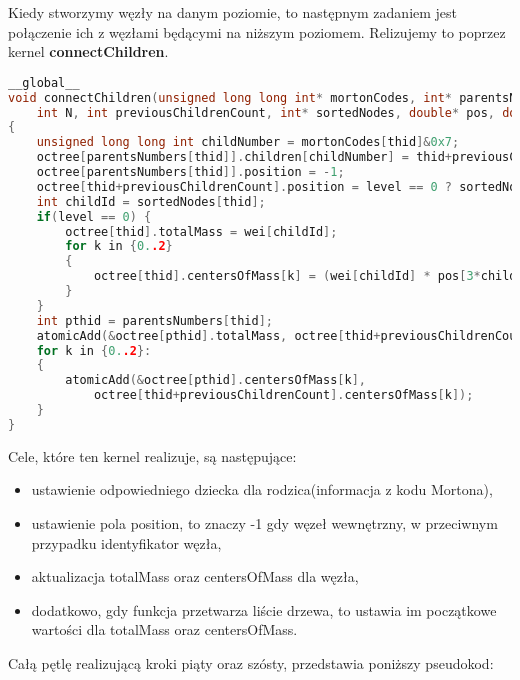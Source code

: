 \documentclass[14pt,twoside,a4paper]{article}
\theoremstyle{definition}
\begin{document}
Kiedy stworzymy węzły na danym poziomie, to następnym zadaniem jest połączenie ich z węzłami będącymi na niższym poziomem. Relizujemy to poprzez kernel \textbf{connectChildren}.
\begin{lstlisting}[language=C++, frame=single, framerule=2pt, caption=Kernel connectChildren]
__global__
void connectChildren(unsigned long long int* mortonCodes, int* parentsNumbers, OctreeNode* octree, 
    int N, int previousChildrenCount, int* sortedNodes, double* pos, double* wei, int level) 
{
    unsigned long long int childNumber = mortonCodes[thid]&0x7; 
    octree[parentsNumbers[thid]].children[childNumber] = thid+previousChildrenCount;
    octree[parentsNumbers[thid]].position = -1;
    octree[thid+previousChildrenCount].position = level == 0 ? sortedNodes[thid] : -1;
    int childId = sortedNodes[thid];
    if(level == 0) {
        octree[thid].totalMass = wei[childId];
        for k in {0..2} 
        {
            octree[thid].centersOfMass[k] = (wei[childId] * pos[3*childId + k]) / wei[childId];
        }
    }
    int pthid = parentsNumbers[thid];
    atomicAdd(&octree[pthid].totalMass, octree[thid+previousChildrenCount].totalMass);
    for k in {0..2}:
    {
    	atomicAdd(&octree[pthid].centersOfMass[k], 
    		octree[thid+previousChildrenCount].centersOfMass[k]);
    }
}
\end{lstlisting}

Cele, które ten kernel realizuje, są następujące:
\begin{itemize}
\item ustawienie odpowiedniego dziecka dla rodzica(informacja z kodu Mortona),
\item ustawienie pola position, to znaczy -1 gdy węzeł wewnętrzny, w przeciwnym przypadku identyfikator węzła,
\item aktualizacja totalMass oraz centersOfMass dla węzła,
\item dodatkowo, gdy funkcja przetwarza liście drzewa, to ustawia im początkowe wartości dla totalMass oraz centersOfMass.
\end{itemize}

Całą pętlę realizującą kroki piąty oraz szósty, przedstawia poniższy pseudokod:
\end{document}
